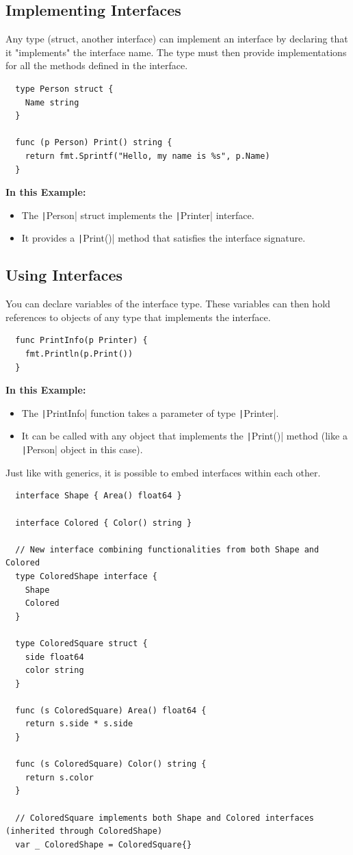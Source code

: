 \documentclass[letterpaper,12pt]{article}
\begin{document}
\subsection{Implementing Interfaces}
Any type (struct, another interface) can implement an interface by declaring that it "implements" the interface name. The type must then provide implementations for all the methods defined in the interface.
\begin{verbatim}
  type Person struct {
    Name string
  }
    
  func (p Person) Print() string {
    return fmt.Sprintf("Hello, my name is %s", p.Name)
  }
\end{verbatim}
\textbf{In this Example:}
\begin{itemize}
  \item The \texttt|Person| struct implements the \texttt|Printer| interface.
  \item It provides a \texttt|Print()| method that satisfies the interface signature.
\end{itemize}
\subsection{Using Interfaces}
You can declare variables of the interface type. These variables can then hold references to objects of any type that implements the interface.
\begin{verbatim}
  func PrintInfo(p Printer) {
    fmt.Println(p.Print())
  }
\end{verbatim}
\textbf{In this Example:}
\begin{itemize}
  \item The \texttt|PrintInfo| function takes a parameter of type \texttt|Printer|.
  \item It can be called with any object that implements the \texttt|Print()| method (like a \texttt|Person| object in this case).
\end{itemize}

\newpage
\noindent
Just like with generics, it is possible to embed interfaces within each other.
\begin{verbatim}
  interface Shape { Area() float64 }
    
  interface Colored { Color() string }
    
  // New interface combining functionalities from both Shape and Colored
  type ColoredShape interface {
    Shape
    Colored
  }
    
  type ColoredSquare struct {
    side float64
    color string
  }
    
  func (s ColoredSquare) Area() float64 {
    return s.side * s.side
  }
    
  func (s ColoredSquare) Color() string {
    return s.color
  }
    
  // ColoredSquare implements both Shape and Colored interfaces (inherited through ColoredShape)
  var _ ColoredShape = ColoredSquare{}
\end{verbatim}
\end{document}

